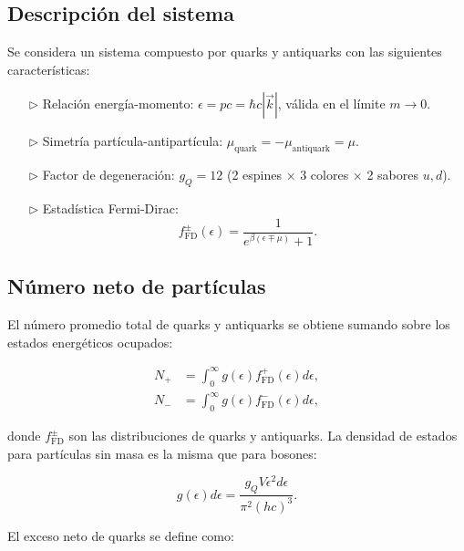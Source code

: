
\subsection{Descripción del sistema}

Se considera un sistema compuesto por quarks y antiquarks con las siguientes características:

\begin{itemize}
    \item[$\triangleright$] Relación energía-momento: \( \epsilon = pc = \hbar c |\vec{k}| \), válida en el límite \( m \rightarrow 0 \).
    \item[$\triangleright$] Simetría partícula-antipartícula: \( \mu_{\text{quark}} = -\mu_{\text{antiquark}} = \mu \).
    \item[$\triangleright$] Factor de degeneración: \( g_Q = 12 \) (2 espines × 3 colores × 2 sabores \( u,d \)).
    \item[$\triangleright$] Estadística Fermi-Dirac:
    \[
    f_{\mathrm{FD}}^{\pm}(\epsilon) = \frac{1}{e^{\beta(\epsilon \mp \mu)} + 1}.
    \]
\end{itemize}


\subsection{Número neto de partículas}

El número promedio total de quarks y antiquarks se obtiene sumando sobre los estados energéticos ocupados:

\begin{align}
N_+ &= \int_0^\infty g(\epsilon) f_{\mathrm{FD}}^+(\epsilon) d\epsilon, \\
N_- &= \int_0^\infty g(\epsilon) f_{\mathrm{FD}}^-(\epsilon) d\epsilon,
\end{align}

donde \( f_{\mathrm{FD}}^\pm \) son las distribuciones de quarks y antiquarks. La densidad de estados para partículas sin masa es la misma que para bosones:

\[
g(\epsilon) d\epsilon = \frac{g_Q V \epsilon^2 d\epsilon}{\pi^2 (hc)^3}.
\]

El exceso neto de quarks se define como:

